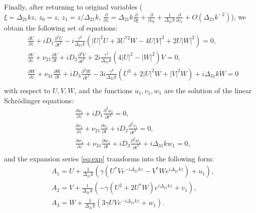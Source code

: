 \documentclass[a4paper, 12pt, onecolumn]{extarticle}
\begin{document}
Finally, after returning to original variables (\(\xi=\Delta_{21}kz,\,z_0=z,\,z_1=z/\Delta_{21}k,\,\frac{\partial}{\partial z}=\Delta_{21}k\frac{\partial}{\partial \xi}+\frac{\partial}{\partial z_0}+\frac{1}{\Delta_{21}k}\frac{\partial}{\partial z_1}+O(\Delta_{21}k^{-2})\)), we obtain the following set of equations:
\begin{equation}
\label{eq:main}
\begin{aligned}
&\frac{\partial U}{\partial z}+iD_1\frac{\partial^2 U}{\partial t^2}-i\frac{\gamma^2}{\Delta_{21} k}(|U|^2U+3U^{*2}W-4U|V|^2+2U|W|^2)=0,\\
&\frac{\partial V}{\partial z}+\nu_{21}\frac{\partial V}{\partial t}+iD_2\frac{\partial^2 V}{\partial t^2}+2i\frac{\gamma^2}{\Delta_{21} k}(4|U|^2-|W|^2)V=0,\\
&\frac{\partial W}{\partial z}+\nu_{31}\frac{\partial W}{\partial t}+iD_3\frac{\partial^2 W}{\partial t^2}-3i\frac{\gamma^2}{\Delta_{21} k}(U^3+2|U|^2W+|V|^2W)+i\Delta_{31}kW=0\\
\end{aligned}
\end{equation}
with respect to \(U,V,W\), and the functions \(u_1,v_1,w_1\) are the solution of the linear Schr\"{o}dinger equations:
\begin{equation}
\label{eq:main_2}
\begin{aligned}
&\frac{\partial u_1}{\partial z}+iD_1\frac{\partial^2 u_1}{\partial t^2}=0,\\
&\frac{\partial v_1}{\partial z}+\nu_{21}\frac{\partial v_1}{\partial t}+iD_2\frac{\partial^2 v_1}{\partial t^2}=0,\\
&\frac{\partial w_1}{\partial z}+\nu_{31}\frac{\partial w_1}{\partial t}+iD_3\frac{\partial^2 w_1}{\partial t^2}+i\Delta_{31}kw_1=0,\\
\end{aligned}
\end{equation}
and the expansion series \eqref{eq:exp} transforms into the following form:
\begin{equation}
\label{eq:exp2}
\begin{aligned}
&A_1=U+\frac{1}{\Delta_{21}k}\left(\gamma(U^*Ve^{-i\Delta_{21}kz}-V^*We^{i\Delta_{21}kz})+u_1\right),\\
&A_2=V+\frac{1}{\Delta_{21}k}\left(-\gamma(U^2+2U^*W)e^{i\Delta_{21}kz}+v_1\right),\\
&A_3=W+\frac{1}{\Delta_{21}k}\left(3\gamma UVe^{-i\Delta_{21}kz}+w_1\right).\\
\end{aligned}
\end{equation}
\end{document}
